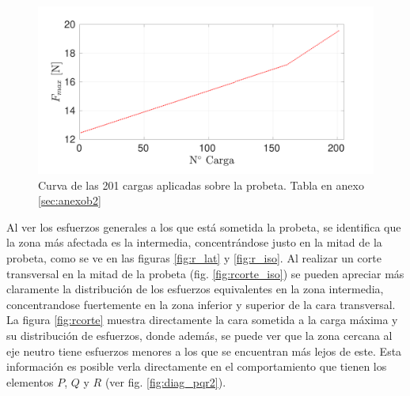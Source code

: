 \begin{figure}[h]
\centering
\includegraphics[width=1\linewidth, trim={0cm 0cm 0cm 0cm}, clip]{Imagenes/fmax_step.pdf}
\caption{Curva de las 201 cargas aplicadas sobre la probeta. Tabla en anexo \ref{sec:anexob2}}
\label{fig:fmax_step}
\end{figure}

Al ver los esfuerzos generales a los que está sometida la probeta, se identifica que la zona más afectada es la intermedia, concentrándose justo en la mitad de la probeta, como se ve en las figuras \ref{fig:r_lat} y \ref{fig:r_iso}. Al realizar un corte transversal en la mitad de la probeta (fig. \ref{fig:rcorte_iso}) se pueden apreciar más claramente la distribución de los esfuerzos equivalentes en la zona intermedia, concentrandose fuertemente en la zona inferior y superior de la cara transversal. La figura \ref{fig:rcorte} muestra directamente la cara sometida a la carga máxima y su distribución de esfuerzos, donde además, se puede ver que la zona cercana al eje neutro tiene esfuerzos menores a los que se encuentran más lejos de este. Esta información es posible verla directamente en el comportamiento que tienen los elementos  $P$, $Q$ y $R$ (ver fig. \ref{fig:diag_pqr2}).


